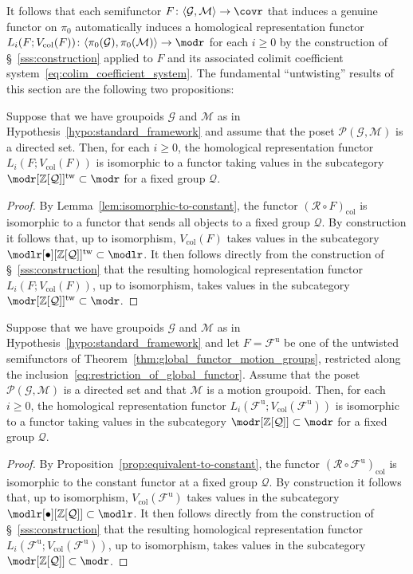 \documentclass[AHL,Unicode,published]{cedram}
\newcommand{\tw}{\mathrm{tw}}
\newcommand{\col}{\mathrm{col}}
\newcommand{\unt}{\mathrm{u}}
\newcommand{\sR}{\mathscr{R}}
\newcommand{\cF}{\mathcal{F}}
\newcommand{\cG}{\mathcal{G}}
\newcommand{\cM}{\mathcal{M}}
\newcommand{\cP}{\mathcal{P}}
\newcommand{\cQ}{\mathcal{Q}}
\newcommand{\bZ}{\mathbb{Z}}
\renewcommand{\geq}{\geqslant}
\begin{document}
It follows that each semifunctor $F \colon \langle \cG, \cM \rangle \to \covr$ that induces a genuine functor on $\pi_{0}$ automatically induces a homological representation functor $L_i(F;V_{\col}(F)) \colon\allowbreak \langle \pi_{0}(\cG), \pi_{0}(\cM) \rangle \to \modr$ for each $i\geq 0$ by the construction of \S~\ref{sss:construction} applied to $F$ and its associated colimit coefficient system~\eqref{eq:colim_coefficient_system}. The fundamental ``untwisting'' results of this section are the following two propositions:

\begin{prop}\label{prop:factoringthroughtopQtw}
Suppose that we have groupoids $\cG$ and $\cM$ as in Hypothesis~\ref{hypo:standard_framework} and assume that the poset $\cP(\cG,\cM)$ is a directed set. Then, for each $i\geq 0$, the homological representation functor $L_i(F;V_{\col}(F))$ is isomorphic to a functor taking values in the subcategory $\modr[\bZ[\cQ]]^{\tw} \subset \modr$ for a fixed group $\cQ$.
\end{prop}


\begin{proof}
By Lemma~\ref{lem:isomorphic-to-constant}, the functor $(\sR \circ F)_{\col}$ is isomorphic to a functor that sends all objects to a fixed group $\cQ$. By construction it follows that, up to isomorphism, $V_{\col}(F)$ takes values in the subcategory $\modlr[\bullet][{\bZ[\cQ]}]^{\tw} \subset \modlr$. It then follows directly from the construction of \S~\ref{sss:construction} that the resulting homological representation functor $L_i(F;V_{\col}(F))$, up to isomorphism, takes values in the subcategory $\modr[{\bZ[\cQ]}]^{\tw} \subset \modr$.
\end{proof}

\begin{prop}\label{prop:factoringthroughtopQ}
Suppose that we have groupoids $\cG$ and $\cM$ as in Hypothesis~\ref{hypo:standard_framework} and let $F = \cF^{\unt}$ be one of the untwisted semifunctors of Theorem~\ref{thm:global_functor_motion_groups}, restricted along the inclusion~\eqref{eq:restriction_of_global_functor}. Assume that the poset $\cP(\cG,\cM)$ is a directed set and that $\cM$ is a motion groupoid. Then, for each $i\geq 0$, the homological representation functor $L_i(\cF^{\unt};V_{\col}(\cF^{\unt}))$ is isomorphic to a functor taking values in the subcategory $\modr[\bZ[\cQ]] \subset \modr$ for a fixed group $\cQ$.
\end{prop}


\begin{proof}
By Proposition~\ref{prop:equivalent-to-constant}, the functor $(\sR \circ \cF^{\unt})_{\col}$ is isomorphic to the constant functor at a fixed group $\cQ$. By construction it follows that, up to isomorphism, $V_{\col}(\cF^{\unt})$ takes values in the subcategory $\modlr[\bullet][{\bZ[\cQ]}] \subset \modlr$. It then follows directly from the construction of \S~\ref{sss:construction} that the resulting homological representation functor $L_i(\cF^{\unt};V_{\col}(\cF^{\unt}))$, up to isomorphism, takes values in the subcategory $\modr[{\bZ[\cQ]}] \subset \modr$.
\end{proof}
\end{document}
